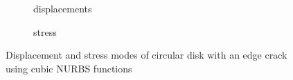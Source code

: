     \begin{figure}[h!]
        \begin{subfigure}[b]{1\linewidth}
            \centering
            \caption{displacements}
        \end{subfigure}
        \begin{subfigure}[b]{1\linewidth}
            \centering
            \caption{stress}
        \end{subfigure}
    \caption{Displacement and stress modes of circular disk with an edge crack using cubic NURBS functions}
    \label{iso_fig:circular_disk_modes}
    \end{figure}

